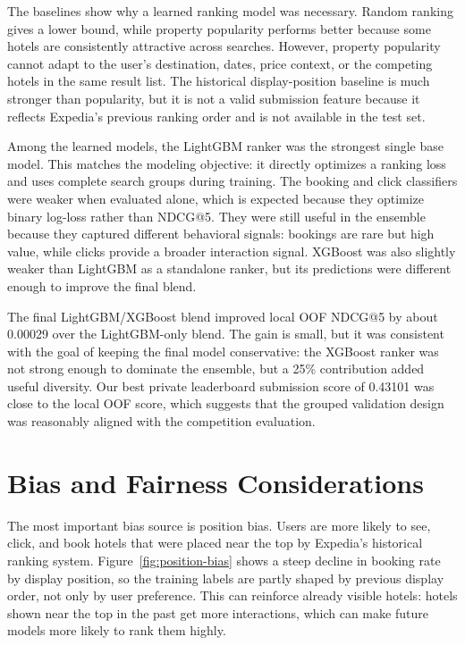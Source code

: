 \documentclass[runningheads]{llncs}
\begin{document}
The baselines show why a learned ranking model was necessary.  Random ranking gives a lower bound, while property popularity performs better because some hotels are consistently attractive across searches.  However, property popularity cannot adapt to the user's destination, dates, price context, or the competing hotels in the same result list.  The historical display-position baseline is much stronger than popularity, but it is not a valid submission feature because it reflects Expedia's previous ranking order and is not available in the test set.

Among the learned models, the LightGBM ranker was the strongest single base model.  This matches the modeling objective: it directly optimizes a ranking loss and uses complete search groups during training.  The booking and click classifiers were weaker when evaluated alone, which is expected because they optimize binary log-loss rather than NDCG@5.  They were still useful in the ensemble because they captured different behavioral signals: bookings are rare but high value, while clicks provide a broader interaction signal.  XGBoost was also slightly weaker than LightGBM as a standalone ranker, but its predictions were different enough to improve the final blend.

The final LightGBM/XGBoost blend improved local OOF NDCG@5 by about 0.00029 over the LightGBM-only blend.  The gain is small, but it was consistent with the goal of keeping the final model conservative: the XGBoost ranker was not strong enough to dominate the ensemble, but a 25\% contribution added useful diversity.  Our best private leaderboard submission score of 0.43101 was close to the local OOF score, which suggests that the grouped validation design was reasonably aligned with the competition evaluation.

\section{Bias and Fairness Considerations}

The most important bias source is position bias.  Users are more likely to see, click, and book hotels that were placed near the top by Expedia's historical ranking system.  Figure~\ref{fig:position-bias} shows a steep decline in booking rate by display position, so the training labels are partly shaped by previous display order, not only by user preference.  This can reinforce already visible hotels: hotels shown near the top in the past get more interactions, which can make future models more likely to rank them highly.
\end{document}
